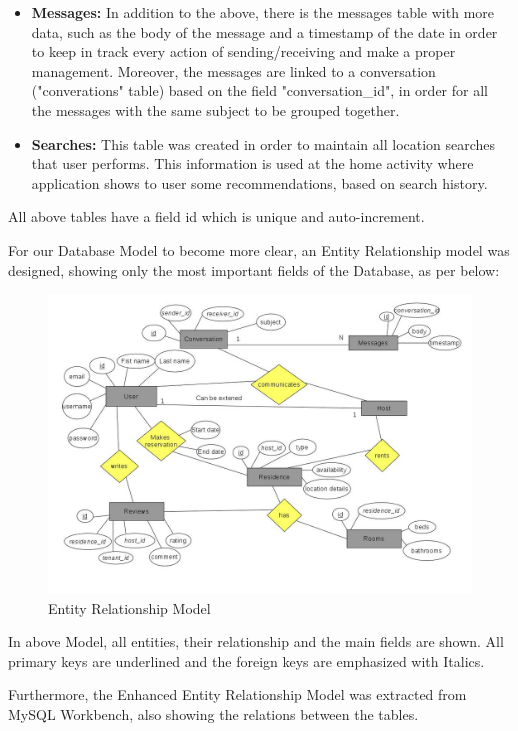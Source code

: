 \documentclass[12pt]{article}
\begin{document}
\begin{itemize}
		\item\textbf{Messages:} In addition to the above, there is the messages table with more data, such as the body of the message and a timestamp of the date in order to keep in track every action of sending/receiving and make a proper management. Moreover, the messages are linked to a conversation ("converations" table) based on the field "conversation\_id", in order for all the messages with the same subject to be grouped together.
		\item \textbf{Searches:} This table was created in order to maintain all location searches that user performs. This information is used at the home activity where application shows to user some recommendations, based on search history.
	\end{itemize}
	All above tables have a field id which is unique and auto-increment. 
	
	For our Database Model to become more clear, an Entity Relationship model was designed, showing only the most important fields of the Database, as per below:
	
	\begin{figure} [H]
		\begin{center}
			\includegraphics [scale = 0.55] {MonteloOntotitonSusxetiseon.jpg}
			\caption{Entity Relationship Model}
		\end{center}
	\end{figure}
	In above Model, all entities, their relationship and the main fields are shown. All primary keys are underlined and the foreign keys are emphasized with Italics. 
	
	Furthermore, the Enhanced Entity Relationship Model was extracted from MySQL Workbench, also showing the relations between the tables. 
	
\end{document}
